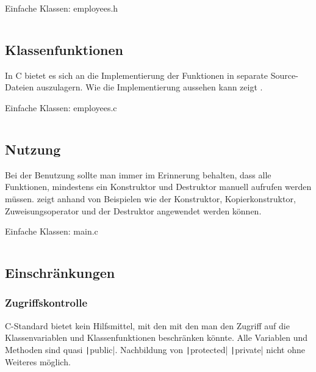 \begin{code}
	\caption{Einfache Klassen: employees.h}
	\label{code:plain:header}
	\inputminted{C}{code/examples/employees_plain/employee.h}
\end{code}



\subsection{Klassenfunktionen}
In C bietet es sich an die Implementierung der Funktionen in separate Source-Dateien auszulagern.
Wie die Implementierung aussehen kann zeigt .

\begin{code}
	\caption{Einfache Klassen: employees.c}
	\label{code:plain:source}
	\inputminted{C}{code/examples/employees_plain/employee.c}
\end{code}


\subsection{Nutzung}
Bei der Benutzung sollte man immer im Erinnerung behalten, dass alle Funktionen, mindestens ein Konstruktor und Destruktor manuell aufrufen werden müssen.
 zeigt anhand von Beispielen wie der Konstruktor, Kopierkonstruktor, Zuweisungsoperator und der Destruktor angewendet werden können.

\begin{code}
	\caption{Einfache Klassen: main.c}
	\label{code:plain:usage}
	\inputminted{C}{code/examples/employees_plain/main.c}
\end{code}


\subsection{Einschränkungen}
\subsubsection{Zugriffskontrolle}
C-Standard bietet kein Hilfsmittel, mit den mit den man den Zugriff auf die Klassenvariablen und Klassenfunktionen beschränken könnte. 
Alle Variablen und Methoden sind quasi \texttt|public|. 
Nachbildung von \texttt|protected| \texttt|private| nicht ohne Weiteres möglich.

